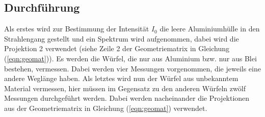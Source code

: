 \subsection{Durchführung}
Als erstes wird zur Bestimmung der Intensität $I_\mathrm{0}$ die leere Aluminiumhülle in den Strahlengang gestellt und ein Spektrum wird aufgenommen, dabei wird die Projektion 2
verwendet (siehe Zeile 2 der Geometriematrix in Gleichung (\ref{eqn:geomat})). Es werden die Würfel, die nur aus Aluminium bzw. nur aus Blei bestehen, vermessen. Dabei werden vier
Messungen vorgenommen, die jeweils eine andere Weglänge haben. Als letztes wird nun der Würfel aus unbekanntem Material vermessen, hier müssen im Gegensatz zu den anderen Würfeln
zwölf Messungen durchgeführt werden. Dabei werden nacheinander die Projektionen aus der Geometriematrix in Gleichung (\ref{eqn:geomat}) verwendet.
